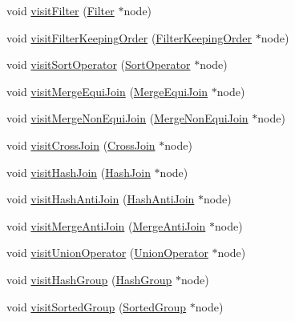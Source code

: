 \begin{DoxyCompactItemize}
\item 
void \hyperlink{class_physical_operator_drawing_visitor_af5a712a2a8dac447846849d91d20821e}{visit\+Filter} (\hyperlink{class_filter}{Filter} $\ast$node)
\item 
void \hyperlink{class_physical_operator_drawing_visitor_a0e517a5b635ad9dd2624ca2ac5f623e6}{visit\+Filter\+Keeping\+Order} (\hyperlink{class_filter_keeping_order}{Filter\+Keeping\+Order} $\ast$node)
\item 
void \hyperlink{class_physical_operator_drawing_visitor_af0aaa68b27e6e562744b0c8211a63b9a}{visit\+Sort\+Operator} (\hyperlink{class_sort_operator}{Sort\+Operator} $\ast$node)
\item 
void \hyperlink{class_physical_operator_drawing_visitor_a78f01a744a33b84011ddedca236e95e1}{visit\+Merge\+Equi\+Join} (\hyperlink{class_merge_equi_join}{Merge\+Equi\+Join} $\ast$node)
\item 
void \hyperlink{class_physical_operator_drawing_visitor_acdfdd3b9f711abff9fb064495e8512e1}{visit\+Merge\+Non\+Equi\+Join} (\hyperlink{class_merge_non_equi_join}{Merge\+Non\+Equi\+Join} $\ast$node)
\item 
void \hyperlink{class_physical_operator_drawing_visitor_aaeb9fbec796677a5483384cbddd3f827}{visit\+Cross\+Join} (\hyperlink{class_cross_join}{Cross\+Join} $\ast$node)
\item 
void \hyperlink{class_physical_operator_drawing_visitor_a22032e2685059a3221b85bc990fe684e}{visit\+Hash\+Join} (\hyperlink{class_hash_join}{Hash\+Join} $\ast$node)
\item 
void \hyperlink{class_physical_operator_drawing_visitor_a1825f8934ad3c2267a40a599b13d2a1a}{visit\+Hash\+Anti\+Join} (\hyperlink{class_hash_anti_join}{Hash\+Anti\+Join} $\ast$node)
\item 
void \hyperlink{class_physical_operator_drawing_visitor_ab47caea2d0f82662947a0bf7087e0514}{visit\+Merge\+Anti\+Join} (\hyperlink{class_merge_anti_join}{Merge\+Anti\+Join} $\ast$node)
\item 
void \hyperlink{class_physical_operator_drawing_visitor_aeaa1cd49533ed1bb74921262b918bb06}{visit\+Union\+Operator} (\hyperlink{class_union_operator}{Union\+Operator} $\ast$node)
\item 
void \hyperlink{class_physical_operator_drawing_visitor_a6841170440f377c240a7c0a7af179a29}{visit\+Hash\+Group} (\hyperlink{class_hash_group}{Hash\+Group} $\ast$node)
\item 
void \hyperlink{class_physical_operator_drawing_visitor_a1c7736861639025a85d54867d7eeafca}{visit\+Sorted\+Group} (\hyperlink{class_sorted_group}{Sorted\+Group} $\ast$node)

\end{DoxyCompactItemize}
